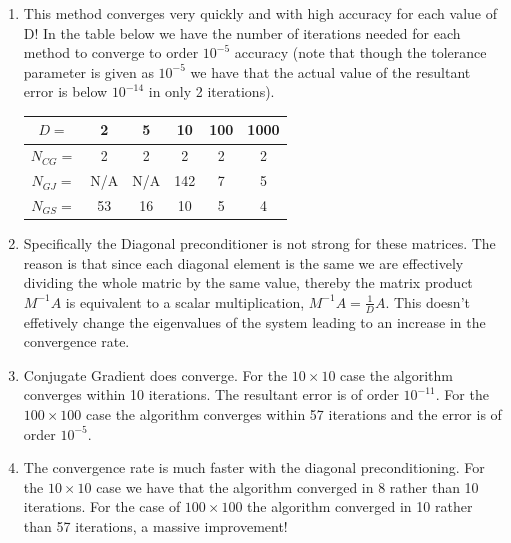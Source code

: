 \documentclass{article}
\begin{document}
\begin{enumerate}
\begin{proof}
        \end{proof}

        \item This method converges very quickly and with high accuracy for each value of D! In the table below we have the number of iterations needed for each method to converge to order $10^{-5}$ accuracy (note that though the tolerance parameter is given as $10^{-5}$ we have that the actual value of the resultant error is below $10^{-14}$ in only 2 iterations). 

            \begin{center}

                \begin{tabular}{|c|c|c|c|c|c|}
                \hline
                $D = $ & 2 & 5 & 10 & 100 & 1000 \\
                \hline
                $N_{CG} = $ & 2 & 2 & 2 & 2 & 2 \\
                \hline
                $N_{GJ} = $ & N/A & N/A & 142 & 7 & 5 \\
                \hline
                $N_{GS} = $ & 53 & 16 & 10 & 5 & 4 \\
                \hline
                \end{tabular}

            \end{center}

        \item Specifically the Diagonal preconditioner is not strong for these matrices. The reason is that since each diagonal element is the same we are effectively dividing the whole matric by the same value, thereby the matrix product $M^{-1}A$ is equivalent to a scalar multiplication, $M^{-1}A = \frac{1}{D}A$. This doesn't effetively change the eigenvalues of the system leading to an increase in the convergence rate. 

        \item
            Conjugate Gradient does converge. For the $10 \times 10$ case the algorithm converges within 10 iterations. The resultant error is of order $10^{-11}$. For the $100 \times 100$ case the algorithm converges within 57 iterations and the error is of order $10^{-5}$. 

        \item
        The convergence rate is much faster with the diagonal preconditioning. For the $10 \times 10$ case we have that the algorithm converged in 8 rather than 10 iterations. For the case of $100\times 100$ the algorithm converged in 10 rather than 57 iterations, a massive improvement!

    \end{enumerate}
\end{document}
